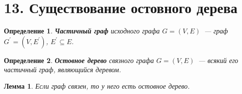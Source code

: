 \documentclass[a4paper,12pt]{article}
\newtheorem*{defin}{Определение}
\newtheorem*{Lemma}{Лемма}
\begin{document}
	
    \pagebreak %
 	\section*{13. Существование остовного дерева}
 	\begin{defin} \textbf{Частичный граф} исходного графа 
 		$G = (V, E)$ — граф $G^{\prime} = (V, E^{\prime})$, $E^{\prime} \subseteq E$.
	\end{defin}

	\begin{defin} \textbf{Остовное дерево} связного графа $G = (V, E)$ — всякий его частичный граф, являющийся деревом.
	\end{defin}

	\begin{Lemma} 
		Если граф связен, то у него есть остовное дерево. 
	\end{Lemma}
\end{document}
